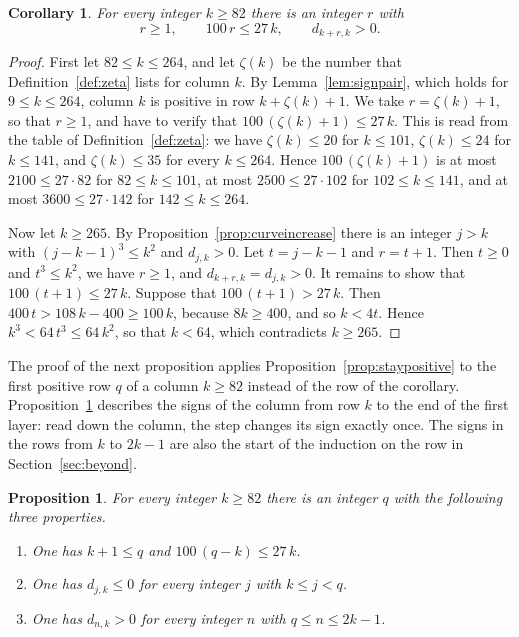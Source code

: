 \documentclass{amsart}
\newtheorem{proposition}[theorem]{Proposition}
\newtheorem{corollary}[theorem]{Corollary}
\theoremstyle{definition}
\theoremstyle{remark}
\numberwithin{equation}{section}
\begin{document}
\begin{corollary}\label{cor:earlypositive}
For every integer $k\ge82$ there is
an integer $r$ with
\[
r\ge1,\qquad100\,r\le27\,k,\qquad d_{k+r,k}>0 .
\]
\end{corollary}

\begin{proof}
First let $82\le k\le264$, and let $\zeta(k)$ be the number that
Definition~\ref{def:zeta} lists for column $k$. By
Lemma~\ref{lem:signpair}, which holds for $9\le k\le264$, column $k$ is
positive in row $k+\zeta(k)+1$. We take $r=\zeta(k)+1$, so that $r\ge1$,
and have to verify that $100\,(\zeta(k)+1)\le27\,k$. This is read from the
table of Definition~\ref{def:zeta}: we have $\zeta(k)\le20$ for $k\le101$,
$\zeta(k)\le24$ for $k\le141$, and $\zeta(k)\le35$ for every $k\le264$.
Hence $100\,(\zeta(k)+1)$ is at most $2100\le27\cdot82$ for
$82\le k\le101$, at most $2500\le27\cdot102$ for $102\le k\le141$, and at
most $3600\le27\cdot142$ for $142\le k\le264$.

Now let $k\ge265$. By Proposition~\ref{prop:curveincrease} there is an
integer $j>k$ with $(j-k-1)^3\le k^2$ and $d_{j,k}>0$. Let $t=j-k-1$ and
$r=t+1$. Then $t\ge0$ and $t^3\le k^2$, we have $r\ge1$, and
$d_{k+r,k}=d_{j,k}>0$. It remains to show that $100\,(t+1)\le27\,k$. Suppose
that $100\,(t+1)>27\,k$. Then $400\,t>108\,k-400\ge100\,k$, because
$8k\ge400$, and so $k<4t$. Hence $k^3<64\,t^3\le64\,k^2$, so that $k<64$,
which contradicts $k\ge265$.
\end{proof}

The proof of the next proposition applies
Proposition~\ref{prop:staypositive} to the first positive row $q$ of a
column $k\ge82$ instead of the row of the corollary.
Proposition~\ref{prop:onechange} describes the signs of the column from
row $k$ to the end of the first layer: read down the column, the step
changes its sign exactly once. The signs in the rows
from $k$ to $2k-1$ are also
the start of the induction on the row in Section~\ref{sec:beyond}.

\begin{proposition}\label{prop:onechange}
For every integer $k\ge82$ there is
an integer $q$ with the following three properties.
\begin{enumerate}
\item One has $k+1\le q$ and $100\,(q-k)\le27\,k$.
\item One has $d_{j,k}\le0$ for every integer $j$ with $k\le j<q$.
\item One has $d_{n,k}>0$ for every integer $n$ with $q\le n\le2k-1$.
\end{enumerate}
\end{proposition}
\end{document}
